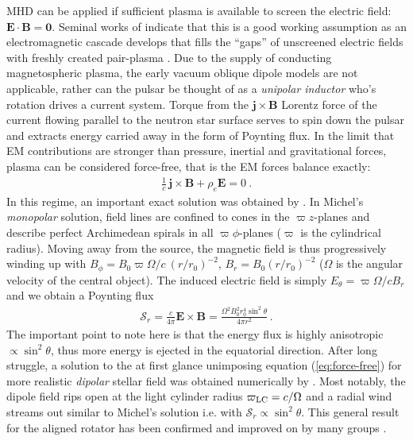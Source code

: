 MHD can be applied if sufficient plasma is available to screen the electric field: $\mathbf{E\cdot B=0}$.  Seminal works of \cite{deutsch1955,1969ApJ...157..869G} indicate that this is a good working assumption as an electromagnetic cascade develops that fills the ``gaps'' of unscreened electric fields with freshly created pair-plasma \citep{Sturrock1971}.  
Due to the supply of conducting magnetospheric plasma, the early vacuum oblique dipole models \citep[e.g.][]{pacini1967,Ostriker:1969} are not applicable, rather can the pulsar be thought of as a \emph{unipolar inductor} who's rotation drives a current system.  Torque from the $\mathbf{j\times B}$ Lorentz force of the current flowing parallel to  the neutron star surface serves to spin down the pulsar and extracts energy carried away in the form of Poynting flux.  
In the limit that EM contributions are stronger than pressure, inertial and gravitational forces, plasma can be considered force-free, that is the EM forces balance exactly: 
\begin{align}
\frac{1}{c}\, \mathbf{j\times B}+\rho_e \mathbf{E}=0\ . \label{eq:force-free}
\end{align}
In this regime, an important exact solution was obtained by \cite{1973ApJ...180L.133M}.  In Michel's \emph{monopolar} solution, field lines are confined to cones in the $\varpi z$-planes and describe perfect Archimedean spirals in all $\varpi\phi$-planes ($\varpi$ is the cylindrical radius).  Moving away from the source, the magnetic field is thus progressively winding up with $B_\phi=B_0\varpi\Omega/c\ (r/r_0)^{-2}$, $B_r=B_0(r/r_0)^{-2}$ ($\Omega$ is the angular velocity of the central object).  The induced electric field is simply $E_\theta = \varpi \Omega/c B_r$ and we obtain a Poynting flux 
%
\begin{align}
\mathcal{S}_r=\frac{c}{4\pi} \mathbf{E\times B} = \frac{\Omega^2 B_0^2 r_0^4 \sin^2\theta  }{4\pi r^2}\, . \label{eq:michelpower}
\end{align}
%
The important point to note here is that the energy flux is highly anisotropic $\propto \sin^2\theta$, thus more energy is ejected in the equatorial direction.  
After long struggle, a solution to the at first glance unimposing equation (\ref{eq:force-free}) for more realistic \emph{dipolar} stellar field was obtained numerically by \cite{1999ApJ...511..351C}.  
Most notably, the dipole field rips open at the light cylinder radius $\varpi_{\rm LC} = c/\Omega$ and a radial wind streams out similar to Michel's solution i.e. with $\mathcal{S}_r\propto \sin^2\theta$.  This general result for the aligned rotator has been confirmed and improved on by many groups \citep{2004MNRAS.349..213G,2005PhRvL..94b1101G,2006MNRAS.368L..30M,ParfreyBeloborodov2012,RuizPaschalidis2014}.  
